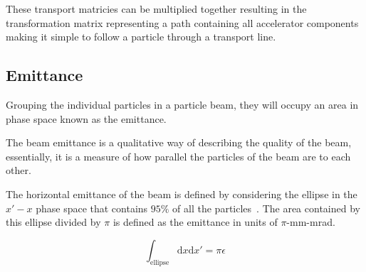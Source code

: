 These transport matricies can be multiplied together resulting in the
transformation matrix representing a path containing all accelerator components
making it simple to follow a particle through a transport line.

\subsection{Emittance}

Grouping the individual particles in a particle beam, they will occupy an area
in phase space known as the emittance.

The beam emittance is a
qualitative way of describing the quality of the beam, essentially, it is a
measure of how parallel the particles of the beam are to each other.



The horizontal emittance of the beam is defined by considering the ellipse in
the \(x'-x\) phase space that contains \(95\%\) of all the
particles~\cite{buon1994beam}. The area contained by this ellipse divided by
\(\pi\) is defined as the emittance in units of \(\pi\)-mm-mrad.

\begin{equation}
	\int_{\text{ellipse}}\mathrm{d}x\mathrm{d}x' =\pi\epsilon
\end{equation}

